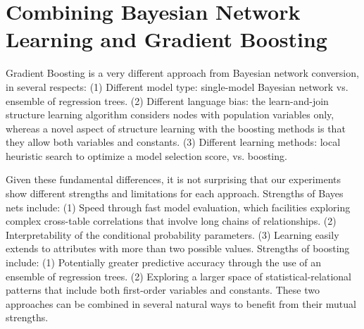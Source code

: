 \documentclass[runningheads,a4paper]{llncs}
\begin{document}

\section{Combining Bayesian Network Learning and Gradient Boosting} \label{sec:combine}

Gradient Boosting is a very different approach from Bayesian network conversion, in several respects: (1) Different model type: single-model Bayesian network vs. ensemble of regression trees. (2) Different language bias: the learn-and-join structure learning algorithm considers nodes with population variables only, whereas a novel aspect of structure learning with the boosting methods is that they allow both variables and constants. (3) Different learning methods: local heuristic search to optimize a model selection score, vs. boosting. 

Given these fundamental differences, it is not surprising that our experiments show different strengths and limitations for each approach. Strengths of Bayes nets include: (1) Speed through fast model evaluation, which facilities exploring complex cross-table correlations that involve long chains of relationships. (2) Interpretability of the conditional probability parameters. (3) Learning easily extends to attributes with more than two possible values.
Strengths of boosting include: (1) Potentially greater predictive accuracy through the use of an ensemble of regression trees. (2) Exploring a larger space of statistical-relational patterns that include both first-order variables and constants. 
These two approaches can be combined in several natural ways to benefit from their mutual strengths.
\end{document}
